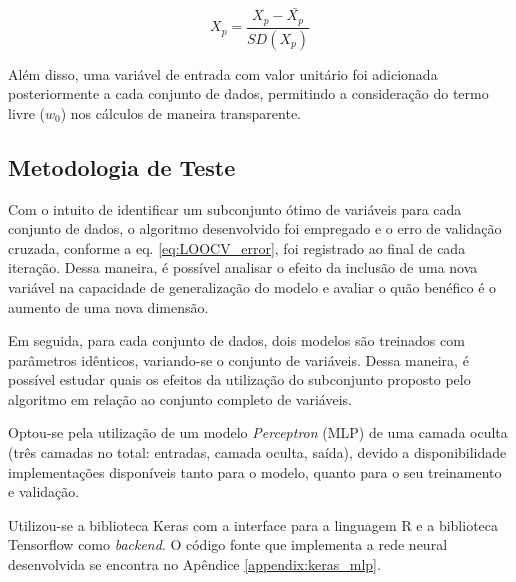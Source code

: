 \begin{equation}
    X_p = \frac{ X_p - \bar{X_p} }{SD(X_p)}
    \label{eq:z-score}
\end{equation}

Além disso, uma variável de entrada com valor unitário foi adicionada posteriormente a cada conjunto de dados, permitindo a consideração do termo livre ($w_0$) nos cálculos de maneira transparente.

\subsection{Metodologia de Teste}

Com o intuito de identificar um subconjunto ótimo de variáveis para cada conjunto de dados, o algoritmo 
desenvolvido foi empregado e o erro de validação cruzada, conforme a eq. \ref{eq:LOOCV_error}, foi registrado ao final de cada iteração. Dessa maneira, é possível analisar o efeito da inclusão de uma nova variável na capacidade de generalização do modelo e avaliar o quão benéfico é o aumento de uma nova dimensão.

Em seguida, para cada conjunto de dados, dois modelos são treinados com parâmetros idênticos, variando-se o conjunto de variáveis. Dessa maneira, é possível estudar quais os efeitos da utilização do subconjunto proposto pelo algoritmo em relação ao conjunto completo de variáveis.

Optou-se pela utilização de um modelo \textit{Perceptron} (MLP) de uma camada oculta (três camadas no total: entradas, camada oculta, saída), devido a disponibilidade implementações disponíveis tanto para o modelo, quanto para o seu treinamento e validação.

Utilizou-se a biblioteca Keras \cite{keras} com a interface para a linguagem R e a biblioteca Tensorflow \cite{tensorflow} como \textit{backend}. O código fonte que implementa a rede neural desenvolvida se encontra no Apêndice \ref{appendix:keras_mlp}.




